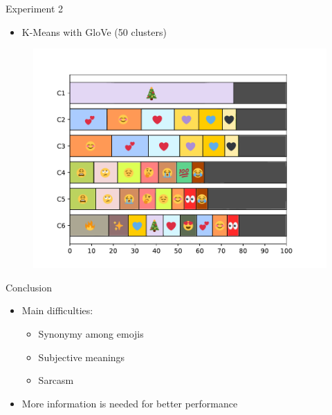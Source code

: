 \documentclass{beamer}
\begin{document}
\begin{frame}{Experiment 2}
	\begin{itemize}
		\item K-Means with GloVe (50 clusters)
	\end{itemize}
	\begin{figure}
		\begin{center}
			\includegraphics[width=0.6\columnwidth]{img/clusters.pdf}
		\end{center}
	\end{figure}
\end{frame}

\begin{frame}{Conclusion}
	\begin{itemize}
		\item Main difficulties:
		\begin{itemize}
			\item Synonymy among emojis
			\item Subjective meanings
			\item Sarcasm
		\end{itemize}
		\item More information is needed for better performance
	\end{itemize}
\end{frame}
\end{document}
